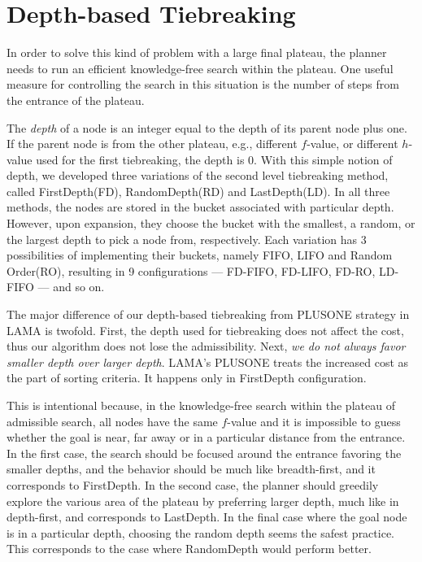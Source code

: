 \section{Depth-based Tiebreaking}

In order to solve this kind of problem with a large final plateau, the
planner needs to run an efficient knowledge-free search within the
plateau.  One useful measure for controlling the search in this
situation is the number of steps from the entrance of the plateau.

The \emph{depth} of a node is an integer equal to the depth of its
parent node plus one. If the parent node is from the other plateau,
e.g., different $f$-value, or different $h$-value used for the first
tiebreaking, the depth is 0.  With this simple notion of depth, we
developed three variations of the second level tiebreaking method,
called FirstDepth(FD), RandomDepth(RD) and LastDepth(LD). In all three
methods, the nodes are stored in the bucket associated with particular
depth.  However, upon expansion, they choose the bucket with the smallest,
a random, or the largest depth to pick a node from, respectively.
Each variation has 3 possibilities of implementing their buckets, namely
FIFO, LIFO and Random Order(RO), resulting in 9 configurations ---
FD-FIFO, FD-LIFO, FD-RO, LD-FIFO --- and so on.

The major difference of our depth-based tiebreaking from PLUSONE
strategy in LAMA is twofold.  First, the depth used for tiebreaking does
not affect the cost, thus our algorithm does not lose the
admissibility. Next, \emph{we do not always favor smaller depth over
larger depth}. LAMA's PLUSONE treats the increased cost as the part of
sorting criteria. It happens only in FirstDepth configuration.

This is intentional because, in the knowledge-free search within the
plateau of admissible search, all nodes have the same $f$-value and it
is impossible to guess whether the goal is near, far away or in a
particular distance from the entrance. In the first case, the search
should be focused around the entrance favoring the smaller depths, and
the behavior should be much like breadth-first, and it corresponds to
FirstDepth. In the second case, the planner should greedily explore the
various area of the plateau by preferring larger depth, much like in
depth-first, and corresponds to LastDepth. In the final case where the
goal node is in a particular depth, choosing the random depth seems the
safest practice. This corresponds to the case where RandomDepth would
perform better.

